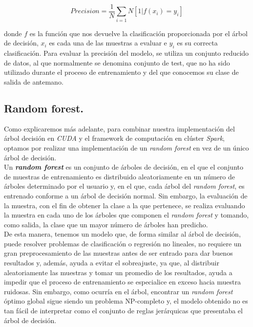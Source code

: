 $$
Precision = \frac{1}{N}\sum_{i=1}{N}[1|f(x_i) = y_i]
$$

donde $f$ es la función que nos devuelve la clasificación proporcionada por el árbol de decisión, $x_i$ es cada una de las muestras a evaluar e $y_i$ es su correcta clasificación. Para evaluar la precisión del modelo, se utiliza un conjunto reducido de datos, al que normalmente se denomina conjunto de test, que no ha sido utilizado durante el proceso de entrenamiento y del que conocemos su clase de salida de antemano.

\subsection{Random forest.}
Como explicaremos más adelante, para combinar nuestra implementación del árbol decisión en \textit{CUDA} y el framework de computación en clúster \textit{Spark}, optamos por realizar una implementación de un \textit{random forest} en vez de un único árbol de decisión. \\

Un \textit{\textbf{random forest}} es un conjunto de árboles de decisión, en el que el conjunto de muestras de entrenamiento es distribuido aleatoriamente en un número de árboles determinado por el usuario y, en el que, cada árbol del \textit{random forest}, es entrenado conforme a un árbol de decisión normal. Sin embargo, la evaluación de la muestra, con el fin de obtener la clase a la que pertenece, se realiza evaluando la muestra en cada uno de los árboles que componen el \textit{random forest} y tomando, como salida, la clase que un mayor número de árboles han predicho. \\

De esta manera, tenemos un modelo que, de forma similar al árbol de decisión, puede resolver problemas de clasificación o regresión no lineales, no requiere un gran preprocesamiento de las muestras antes de ser entrado para dar buenos resultados y, además, ayuda a evitar el sobreajuste, ya que, al distribuir aleatoriamente las muestras y tomar un promedio de los resultados, ayuda a impedir que el proceso de entrenamiento se especialice en exceso hacia muestra ruidosas. Sin embargo, como ocurría en el árbol, encontrar un \textit{random forest} óptimo global sigue siendo un problema NP-completo y, el modelo obtenido no es tan fácil de interpretar como el conjunto de reglas jerárquicas que presentaba el árbol de decisión.


